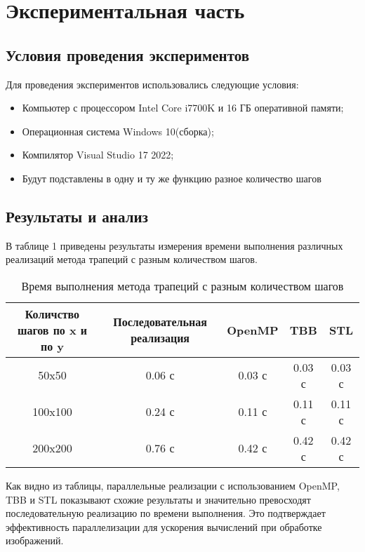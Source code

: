 \documentclass[]{article}
\theoremstyle{remark}
\theoremstyle{definition}
\begin{document}
\newpage

\section{Экспериментальная часть}

\subsection{Условия проведения экспериментов}

\par Для проведения экспериментов использовались следующие условия:

\begin{itemize}
    \item Компьютер с процессором Intel Core i7700K и 16 ГБ оперативной памяти;
    \item Операционная система Windows 10(сборка);
    \item Компилятор Visual Studio 17 2022;
    \item Будут подставлены в одну и ту же функцию разное количество шагов
\end{itemize}

\subsection{Результаты и анализ}

\par В таблице 1 приведены результаты измерения времени выполнения различных реализаций метода трапеций с разным количеством шагов.

\begin{table}[h]
    \centering
    \begin{tabular}{|c|c|c|c|c|}
        \hline
        Количство шагов по x и по y & Последовательная реализация & OpenMP & TBB & STL \\
        \hline
        50x50 & 0.06 с & 0.03 с & 0.03 с & 0.03 с \\
        \hline
        100x100 & 0.24 с & 0.11 с & 0.11 с & 0.11 с \\
        \hline
        200x200 & 0.76 с & 0.42 с & 0.42 с & 0.42 с \\
        \hline
    \end{tabular}
    \caption{Время выполнения метода трапеций с разным количеством шагов}
    \label{tab:results}
\end{table}

\par Как видно из таблицы, параллельные реализации с использованием OpenMP, TBB и STL показывают схожие результаты и значительно превосходят последовательную реализацию по времени выполнения. Это подтверждает эффективность параллелизации для ускорения вычислений при обработке изображений.
\end{document}
